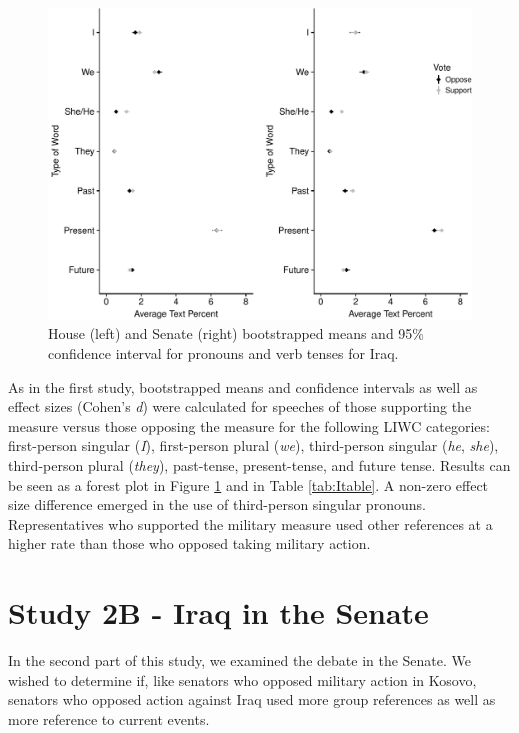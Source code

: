 \documentclass[english,man]{apa6}
\theoremstyle{definition}
\theoremstyle{definition}
\theoremstyle{definition}
\theoremstyle{remark}
\begin{document}
\begin{figure}
\centering
\includegraphics{Language_of_War_Markdown_files/figure-latex/Ipic-1.pdf}
\caption{\label{fig:Ipic}House (left) and Senate (right) bootstrapped means
and 95\% confidence interval for pronouns and verb tenses for Iraq.}
\end{figure}

As in the first study, bootstrapped means and confidence intervals as
well as effect sizes (Cohen's \emph{d}) were calculated for speeches of
those supporting the measure versus those opposing the measure for the
following LIWC categories: first-person singular (\emph{I}),
first-person plural (\emph{we}), third-person singular (\emph{he},
\emph{she}), third-person plural (\emph{they}), past-tense,
present-tense, and future tense. Results can be seen as a forest plot in
Figure \ref{fig:Ipic} and in Table \ref{tab:Itable}. A non-zero effect
size difference emerged in the use of third-person singular pronouns.
Representatives who supported the military measure used other references
at a higher rate than those who opposed taking military action.

\section{Study 2B - Iraq in the
Senate}\label{study-2b---iraq-in-the-senate}

In the second part of this study, we examined the debate in the Senate.
We wished to determine if, like senators who opposed military action in
Kosovo, senators who opposed action against Iraq used more group
references as well as more reference to current events.
\end{document}

